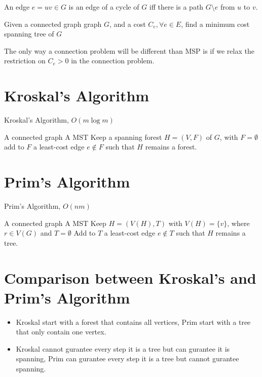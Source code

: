 			\begin{lemma}
				An edge $e = uv \in G$ is an edge of a cycle of $G$ iff there is a path $G\setminus e$ from $u$ to $v$.
			\end{lemma}

			\begin{definition}
				Given a connected graph graph $G$, and a cost $C_e, \forall e\in E$, find a minimum cost spanning tree of $G$
			\end{definition}

			The only way a connection problem will be different than MSP is if we relax the restriction on $C_e > 0$ in the connection problem.

		\section{Kroskal's Algorithm}
			\begin{algorithm}
				\caption{Kroskal's Algorithm, $O(m \log m)$}
				\begin{algorithmic}
					\REQUIRE A connected graph
					\ENSURE A MST
					\STATE Keep a spanning forest $H=(V, F)$ of $G$, with $F=\emptyset$
						\STATE add to $F$ a least-cost edge $e\notin F$ such that $H$ remains a forest.
					\ENDWHILE
				\end{algorithmic}
			\end{algorithm}

		\section{Prim's Algorithm}
			\begin{algorithm}
				\caption{Prim's Algorithm, $O(nm)$}
				\begin{algorithmic}
					\REQUIRE A connected graph
					\ENSURE A MST
					\STATE Keep $H = (V(H), T)$ with $V(H) = \{v\}$, where $r\in V(G)$ and $T=\emptyset$
					\WHILE {$|V(T)| < |V|$}
						\STATE Add to $T$ a least-cost edge $e \notin T$ such that $H$ remains a tree.
					\ENDWHILE
				\end{algorithmic}
			\end{algorithm}

		\section{Comparison between Kroskal's and Prim's Algorithm}
			\begin{itemize}
				\item Kroskal start with a forest that contains all vertices, Prim start with a tree that only contain one vertex.
				\item Kroskal cannot gurantee every step it is a tree but can gurantee it is spanning, Prim can gurantee every step it is a tree but cannot gurantee spanning.
			\end{itemize}

